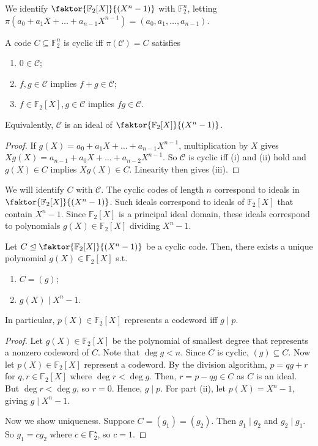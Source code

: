 We identify $\faktor{\mathbb F_2[X]}{(X^n - 1)}$ with $\mathbb F_2^n$, letting $\pi(a_0 + a_1X + \dots + a_{n-1}X^{n-1}) = (a_0, a_1, \dots, a_{n-1})$.

\begin{lemma}
    A code $C \subseteq \mathbb F_2^n$ is cyclic iff $\pi(\mathcal C) = C$ satisfies
    \begin{enumerate}
        \item $0 \in \mathcal C$;
        \item $f, g \in \mathcal C$ implies $f + g \in \mathcal C$;
        \item $f \in \mathbb F_2[X], g \in \mathcal C$ implies $fg \in \mathcal C$.
    \end{enumerate}
\end{lemma}

Equivalently, $\mathcal C$ is an ideal of $\faktor{\mathbb F_2[X]}{(X^n - 1)}$.

\begin{proof}
    If $g(X) = a_0 + a_1X + \dots + a_{n-1}X^{n-1}$, multiplication by $X$ gives $Xg(X) = a_{n-1} + a_0X + \dots + a_{n-2}X^{n-1}$.
    So $\mathcal C$ is cyclic iff (i) and (ii) hold and $g(X) \in C$ implies $Xg(X) \in C$.
    Linearity then gives (iii).
\end{proof}

We will identify $C$ with $\mathcal C$.
The cyclic codes of length $n$ correspond to ideals in $\faktor{\mathbb F_2[X]}{(X^n - 1)}$.
Such ideals correspond to ideals of $\mathbb F_2[X]$ that contain $X^n - 1$.
Since $\mathbb F_2[X]$ is a principal ideal domain, these ideals correspond to polynomials $g(X) \in \mathbb F_2[X]$ dividing $X^n - 1$.

\begin{theorem}
    Let $C \trianglelefteq \faktor{\mathbb F_2[X]}{(X^n - 1)}$ be a cyclic code.
    Then, there exists a unique  polynomial $g(X) \in \mathbb F_2[X]$ s.t.
    \begin{enumerate}
        \item $C = (g)$;
        \item $g(X) \mid X^n - 1$.
    \end{enumerate}
    In particular, $p(X) \in \mathbb F_2[X]$ represents a codeword iff $g \mid p$.
\end{theorem}

\begin{proof}
    Let $g(X) \in \mathbb F_2[X]$ be the polynomial of smallest degree that represents a nonzero codeword of $C$.
    Note that $\deg g < n$.
    Since $C$ is cyclic, $(g) \subseteq C$.
    Now let $p(X) \in \mathbb F_2[X]$ represent a codeword.
    By the division algorithm, $p = qg + r$ for $q, r \in \mathbb F_2[X]$ where $\deg r < \deg g$.
    Then, $r = p - qg \in C$ as $C$ is an ideal.
    But $\deg r < \deg g$, so $r = 0$.
    Hence, $g \mid p$.
    For part (ii), let $p(X) = X^n - 1$, giving $g \mid X^n - 1$.

    Now we show uniqueness.
    Suppose $C = (g_1) = (g_2)$.
    Then $g_1 \mid g_2$ and $g_2 \mid g_1$.
    So $g_1 = cg_2$ where $c \in \mathbb F_2^\star$, so $c = 1$.
\end{proof}

